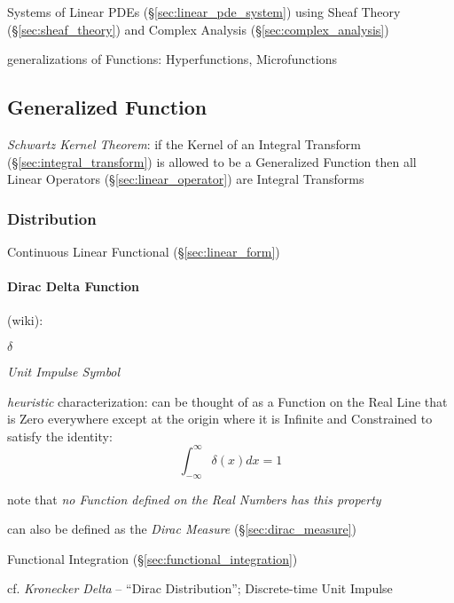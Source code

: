 Systems of Linear PDEs (\S\ref{sec:linear_pde_system}) using Sheaf Theory
(\S\ref{sec:sheaf_theory}) and Complex Analysis (\S\ref{sec:complex_analysis})

generalizations of Functions: Hyperfunctions, Microfunctions



\subsection{Generalized Function}\label{sec:generalized_function}

\emph{Schwartz Kernel Theorem}: if the Kernel of an Integral Transform
(\S\ref{sec:integral_transform}) is allowed to be a Generalized Function then
all Linear Operators (\S\ref{sec:linear_operator}) are Integral Transforms



\subsubsection{Distribution}\label{sec:distribution}

Continuous Linear Functional (\S\ref{sec:linear_form})



\paragraph{Dirac Delta Function}\label{sec:dirac_delta}\hfill

(wiki):

$\delta$

\emph{Unit Impulse Symbol}

\emph{heuristic} characterization: can be thought of as a Function on the Real
Line that is Zero everywhere except at the origin where it is Infinite and
Constrained to satisfy the identity:
\[
  \int_{-\infty}^\infty \delta(x) dx = 1
\]

note that \emph{no Function defined on the Real Numbers has this property}

can also be defined as the \emph{Dirac Measure} (\S\ref{sec:dirac_measure})

\fist Functional Integration (\S\ref{sec:functional_integration})

cf. \emph{Kronecker Delta} -- ``Dirac Distribution''; Discrete-time Unit Impulse



